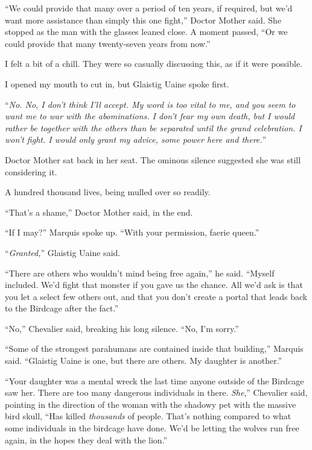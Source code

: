 ``We could provide that many over a period of ten years, if required, but we'd want more assistance than simply this one fight,'' Doctor Mother said.  She stopped as the man with the glasses leaned close.  A moment passed, ``Or we could provide that many twenty-seven years from now.''



I felt a bit of a chill.  They were so casually discussing this, as if it were possible.



I opened my mouth to cut in, but Glaistig Uaine spoke first.



``\emph{No.  No, I don't think I'll accept.  My word is too vital to me, and you seem to want me to war with the abominations.  I don't fear my own death, but I would rather be together with the others than be separated until the grand celebration.  I won't fight.  I would only grant my advice, some power here and there.}''



Doctor Mother sat back in her seat.  The ominous silence suggested she was still considering it.



A hundred thousand lives, being mulled over so readily.



``That's a shame,'' Doctor Mother said, in the end.



``If I may?'' Marquis spoke up.  ``With your permission, faerie queen.''



``\emph{Granted,}'' Glaistig Uaine said.



``There are others who wouldn't mind being free again,'' he said.  ``Myself included.  We'd fight that monster if you gave us the chance.  All we'd ask is that you let a select few others out, and that you don't create a portal that leads back to the Birdcage after the fact.''



``No,'' Chevalier said, breaking his long silence.  ``No, I'm sorry.''



``Some of the strongest parahumans are contained inside that building,'' Marquis said.  ``Glaistig Uaine is one, but there are others.  My daughter is another.''



``Your daughter was a mental wreck the last time anyone outside of the Birdcage saw her.  There are too many dangerous individuals in there.  \emph{She},'' Chevalier said, pointing in the direction of the woman with the shadowy pet with the massive bird skull, ``Has killed \emph{thousands} of people.  That's nothing compared to what some individuals in the birdcage have done.  We'd be letting the wolves run free again, in the hopes they deal with the lion.''



